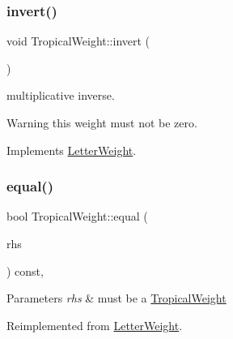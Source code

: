 \subsubsection{\texorpdfstring{invert()}{invert()}\hspace{0.1cm}{\footnotesize\ttfamily [2/4]}}
{\footnotesize\ttfamily void Tropical\+Weight\+::invert (\begin{DoxyParamCaption}{ }\end{DoxyParamCaption})\hspace{0.3cm}{\ttfamily [virtual]}}



multiplicative inverse. 

\begin{DoxyWarning}{Warning}
this weight must not be zero. 
\end{DoxyWarning}


Implements \mbox{\hyperlink{classLetterWeight_a76a013deb82c8c1511cb6a68e5a06218}{Letter\+Weight}}.

\mbox{\label{group__weight_ga7203d6028f02a2791bdeede99ef59b97}} 
\subsubsection{\texorpdfstring{equal()}{equal()}\hspace{0.1cm}{\footnotesize\ttfamily [3/4]}}
{\footnotesize\ttfamily bool Tropical\+Weight\+::equal (\begin{DoxyParamCaption}\item[{const \mbox{\hyperlink{classLetterWeight}{Letter\+Weight}} $\ast$}]{rhs }\end{DoxyParamCaption}) const\hspace{0.3cm}{\ttfamily [protected]}, {\ttfamily [virtual]}}


\begin{DoxyParams}{Parameters}
{\em rhs} & must be a \mbox{\hyperlink{classTropicalWeight}{Tropical\+Weight}} \\
\hline
\end{DoxyParams}


Reimplemented from \mbox{\hyperlink{group__weight_gaf00322921db3c5212f8d5ca63081d689}{Letter\+Weight}}.

\mbox{\label{group__weight_ga4237553cf4beafd5a96bd0ac7da7ac11}} 
